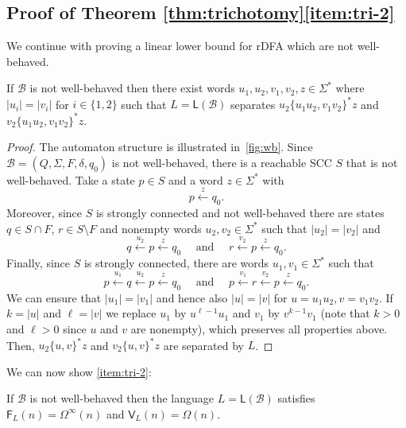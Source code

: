 \documentclass{article}\usepackage[a4paper,margin=20mm]{geometry}
\newcommand{\B}{\mathcal{B}}
\newcommand{\F}{\mathsf{F}}
\renewcommand{\L}{\mathsf{L}}
\newcommand{\V}{\mathsf{V}}
\newcommand{\Omegainf}{\Omega^{\scriptscriptstyle{\infty}}}
\begin{document}
\subsection{Proof of Theorem \ref{thm:trichotomy}\ref{item:tri-2}}
We continue with proving a linear lower bound for rDFA which are not well-behaved.

\begin{lemma}
	\label{lem:linear-lb}
	If $\B$ is not well-behaved then there exist words $u_1, u_2, v_1, v_2, z \in \Sigma^*$
	where $|u_i| = |v_i|$ for $i \in \{1,2\}$
	such that $L = \L(\B)$ separates $u_2\{u_1u_2,v_1v_2\}^*z$ and $v_2\{u_1u_2,v_1v_2\}^*z$.
\end{lemma}

\begin{proof}
	The automaton structure is illustrated in~\cref{fig:wb}.
	Since $\B = (Q,\Sigma,F,\delta,q_0)$ is not well-behaved, 
	there is a reachable SCC $S$ that is not well-behaved. 
	Take a state $p \in S$ and a word $z \in \Sigma^*$ with 
	\[
	p \xleftarrow{z} q_0 .
	\]
	Moreover, since $S$ is strongly connected and not well-behaved
	there are states $q \in S \cap F$, $r \in S \setminus F$
	and nonempty words $u_2, v_2 \in \Sigma^*$ such that $|u_2| = |v_2|$ and
	\[
	 q \xleftarrow{u_2} p \xleftarrow{z} q_0 \quad\text{ and }\quad  r \xleftarrow{v_2} p \xleftarrow{z} q_0 .
	\]
	Finally, since  $S$ is strongly connected, there are words $u_1, v_1 \in \Sigma^*$ such that
	\[
		p \xleftarrow{u_1} q \xleftarrow{u_2} p \xleftarrow{z} q_0 \quad\text{ and }\quad p \xleftarrow{v_1} r \xleftarrow{v_2} p \xleftarrow{z} q_0 .
	\]
	We can ensure that $|u_1| = |v_1|$ and hence also $|u| = |v|$ for $u = u_1 u_2, v = v_1 v_2$.
	If $k = |u|$ and $\ell = |v|$ we replace $u_1$ by $u^{\ell-1} u_1$
	and $v_1$ by $v^{k-1} v_1$ (note that $k > 0$ and $\ell > 0$ since 
	$u$ and $v$ are nonempty), which preserves all properties above.
	Then, $u_2\{u,v\}^*z$ and $v_2\{u,v\}^*z$ are separated by $L$.
\end{proof}
We can now show \ref{item:tri-2}:
\begin{proposition}
	\label{prop:linear-lb}
	If $\B$ is not well-behaved then the language $L = \L(\B)$
	satisfies $\F_L(n) = \Omegainf(n)$ and $\V_L(n) = \Omega(n)$.
\end{proposition}
	
\end{document}
